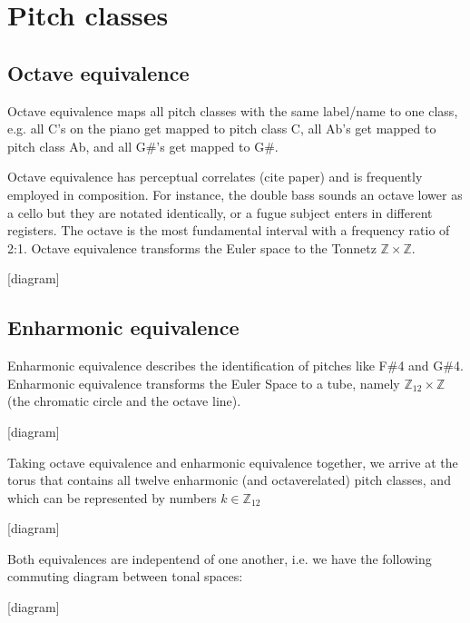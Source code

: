 \documentclass[letterpaper,10pt,english]{sphinxmanual}
\begin{document}
\section{Pitch classes}
\label{\detokenize{3_set_theory:pitch-classes}}

\subsection{Octave equivalence}
\label{\detokenize{3_set_theory:octave-equivalence}}
\sphinxAtStartPar
Octave equivalence maps all pitch classes with the same label/name to one class,
e.g. all C’s on the piano get mapped to pitch class C, all Ab’s get mapped to pitch class Ab,
and all G\#’s get mapped to G\#.

\sphinxAtStartPar
Octave equivalence has perceptual correlates (cite paper) and is frequently employed in composition.
For instance, the double bass sounds an octave lower as a cello but they are notated identically,
or a fugue subject enters in different registers.
The octave is the most fundamental interval with a frequency ratio of 2:1.
Octave equivalence transforms the Euler space to the Tonnetz \(\mathbb{Z}\times\mathbb{Z}\).

\sphinxAtStartPar
{[}diagram{]}


\subsection{Enharmonic equivalence}
\label{\detokenize{3_set_theory:enharmonic-equivalence}}
\sphinxAtStartPar
Enharmonic equivalence describes the identification of pitches like F\#4 and G\#4.
Enharmonic equivalence transforms the Euler Space to a tube, namely \(\mathbb{Z}_{12} \times \mathbb{Z}\)
(the chromatic circle and the octave line).

\sphinxAtStartPar
{[}diagram{]}

\sphinxAtStartPar
Taking octave equivalence and enharmonic equivalence together,
we arrive at the torus that contains all twelve enharmonic (and octave\sphinxhyphen{}related) pitch classes,
and which can be represented by numbers \(k\in \mathbb{Z}_{12}\)

\sphinxAtStartPar
{[}diagram{]}

\sphinxAtStartPar
Both equivalences are indepentend of one another, i.e. we have the following commuting diagram between tonal spaces:

\sphinxAtStartPar
{[}diagram{]}
\end{document}
